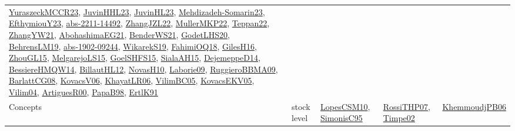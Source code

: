 {\begin{longtable}{lp{3cm}>{\raggedright}p{6cm}>{\raggedright}p{6cm}p{8cm}}
\href{articles/YuraszeckMCCR23.pdf}{YuraszeckMCCR23}\cite{YuraszeckMCCR23}, \href{papers/JuvinHHL23.pdf}{JuvinHHL23}\cite{JuvinHHL23}, \href{papers/JuvinHL23.pdf}{JuvinHL23}\cite{JuvinHL23}, \href{papers/Mehdizadeh-Somarin23.pdf}{Mehdizadeh-Somarin23}\cite{Mehdizadeh-Somarin23}, \href{papers/EfthymiouY23.pdf}{EfthymiouY23}\cite{EfthymiouY23}, \href{articles/abs-2211-14492.pdf}{abs-2211-14492}\cite{abs-2211-14492}, \href{papers/ZhangJZL22.pdf}{ZhangJZL22}\cite{ZhangJZL22}, \href{articles/MullerMKP22.pdf}{MullerMKP22}\cite{MullerMKP22}, \href{papers/Teppan22.pdf}{Teppan22}\cite{Teppan22}, \href{articles/ZhangYW21.pdf}{ZhangYW21}\cite{ZhangYW21}, \href{articles/AbohashimaEG21.pdf}{AbohashimaEG21}\cite{AbohashimaEG21}, \href{papers/BenderWS21.pdf}{BenderWS21}\cite{BenderWS21}, \href{papers/GodetLHS20.pdf}{GodetLHS20}\cite{GodetLHS20}, \href{papers/BehrensLM19.pdf}{BehrensLM19}\cite{BehrensLM19}, \href{articles/abs-1902-09244.pdf}{abs-1902-09244}\cite{abs-1902-09244}, \href{articles/WikarekS19.pdf}{WikarekS19}\cite{WikarekS19}, \href{articles/FahimiOQ18.pdf}{FahimiOQ18}\cite{FahimiOQ18}, \href{papers/GilesH16.pdf}{GilesH16}\cite{GilesH16}, \href{papers/ZhouGL15.pdf}{ZhouGL15}\cite{ZhouGL15}, \href{papers/MelgarejoLS15.pdf}{MelgarejoLS15}\cite{MelgarejoLS15}, \href{articles/GoelSHFS15.pdf}{GoelSHFS15}\cite{GoelSHFS15}, \href{papers/SialaAH15.pdf}{SialaAH15}\cite{SialaAH15}, \href{papers/DejemeppeD14.pdf}{DejemeppeD14}\cite{DejemeppeD14}, \href{papers/BessiereHMQW14.pdf}{BessiereHMQW14}\cite{BessiereHMQW14}, \href{papers/BillautHL12.pdf}{BillautHL12}\cite{BillautHL12}, \href{articles/NovasH10.pdf}{NovasH10}\cite{NovasH10}, \href{papers/Laborie09.pdf}{Laborie09}\cite{Laborie09}, \href{articles/RuggieroBBMA09.pdf}{RuggieroBBMA09}\cite{RuggieroBBMA09}, \href{papers/BarlattCG08.pdf}{BarlattCG08}\cite{BarlattCG08}, \href{papers/KovacsV06.pdf}{KovacsV06}\cite{KovacsV06}, \href{articles/KhayatLR06.pdf}{KhayatLR06}\cite{KhayatLR06}, \href{articles/VilimBC05.pdf}{VilimBC05}\cite{VilimBC05}, \href{papers/KovacsEKV05.pdf}{KovacsEKV05}\cite{KovacsEKV05}, \href{papers/Vilim04.pdf}{Vilim04}\cite{Vilim04}, \href{articles/ArtiguesR00.pdf}{ArtiguesR00}\cite{ArtiguesR00}, \href{articles/PapaB98.pdf}{PapaB98}\cite{PapaB98}, \href{papers/ErtlK91.pdf}{ErtlK91}\cite{ErtlK91}\\
Concepts & stock level & \href{articles/LopesCSM10.pdf}{LopesCSM10}\cite{LopesCSM10}, \href{papers/SimonisC95.pdf}{SimonisC95}\cite{SimonisC95} & \href{papers/RossiTHP07.pdf}{RossiTHP07}\cite{RossiTHP07}, \href{articles/Timpe02.pdf}{Timpe02}\cite{Timpe02} & \href{papers/KhemmoudjPB06.pdf}{KhemmoudjPB06}\cite{KhemmoudjPB06}\\

\end{longtable}}
